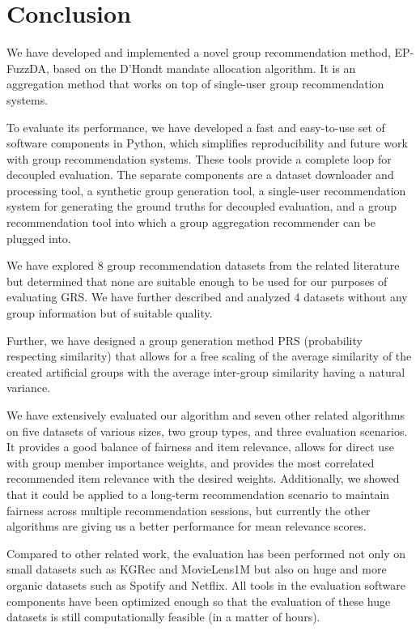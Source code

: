 \chapter{Conclusion}  \label{chap:conclusion}

We have developed and implemented a novel group recommendation method, EP-FuzzDA, based on the D'Hondt mandate allocation algorithm. It is an aggregation method that works on top of single-user group recommendation systems.

To evaluate its performance, we have developed a fast and easy-to-use set of software components in Python, which simplifies reproducibility and future work with group recommendation systems. These tools provide a complete loop for decoupled evaluation. The separate components are a dataset downloader and processing tool, a synthetic group generation tool, a single-user recommendation system for generating the ground truths for decoupled evaluation, and a group recommendation tool into which a group aggregation recommender can be plugged into.

We have explored 8 group recommendation datasets from the related literature but determined that none are suitable enough to be used for our purposes of evaluating GRS. We have further described and analyzed 4 datasets without any group information but of suitable quality.

Further, we have designed a group generation method PRS (probability respecting similarity) that allows for a free scaling of the average similarity of the created artificial groups with the average inter-group similarity having a natural variance.

We have extensively evaluated our algorithm and seven other related algorithms on five datasets of various sizes, two group types, and three evaluation scenarios. It provides a good balance of fairness and item relevance, allows for direct use with group member importance weights, and provides the most correlated recommended item relevance with the desired weights. Additionally, we showed that it could be applied to a long-term recommendation scenario to maintain fairness across multiple recommendation sessions, but currently the other algorithms are giving us a better performance for mean relevance scores.

Compared to other related work, the evaluation has been performed not only on small datasets such as KGRec and MovieLens1M but also on huge and more organic datasets such as Spotify and Netflix. All tools in the evaluation software components have been optimized enough so that the evaluation of these huge datasets is still computationally feasible (in a matter of hours).


